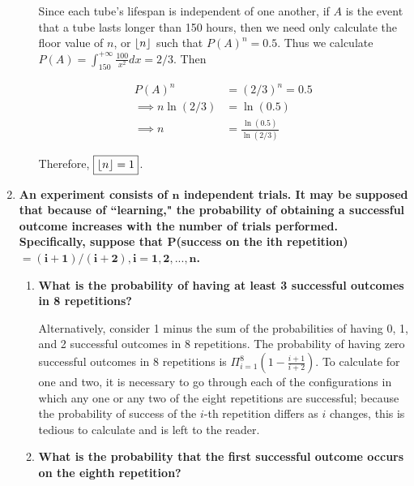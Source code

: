 \documentclass[10pt, oneside]{article}   	%
\theoremstyle{definition}
\DeclarePairedDelimiter\floor{\lfloor}{\rfloor}
\begin{document}
\begin{enumerate}[label=4.\arabic*]
\begin{enumerate}
	Since each tube's lifespan is independent of one another, if $A$ is the event that a tube lasts longer than 150 hours, then we need only calculate the floor value of $n$, or $\floor{n}$ such that $P(A)^n = 0.5$. Thus we calculate $P(A) = \int^{+\infty}_{150} \frac{100}{x^2} dx = 2/3$. Then
	
	\begin{align*}
	P(A)^n &= (2/3)^n = 0.5 \\
	\implies n \ln (2/3) &= \ln (0.5) \\
	\implies n &= \frac{\ln (0.5)}{ \ln(2/3)}
	\end{align*}
	
	Therefore, $\boxed{\floor{n} = 1}$.
	
	\end{enumerate}

\item  \begin{tcolorbox}[
  colback=Cerulean!5!white,
  colframe=Cerulean!75!black]
\textbf{An experiment consists of $\bm{n}$ independent trials. It may be supposed that because of ``learning," the probability of obtaining a successful outcome increases with the number of trials performed. Specifically, suppose that $\bm{P}$(success on the ith repetition) $\bm{= (i+1)/(i+2), i = 1,2,...,n}$.}
\end{tcolorbox}

	\begin{enumerate}
	\item  \begin{tcolorbox}[
	  colback=Cerulean!5!white,
	  colframe=Cerulean!75!black]
	\textbf{What is the probability of having at least 3 successful outcomes in 8 repetitions?}
	\end{tcolorbox}
	
	Alternatively, consider 1 minus the sum of the probabilities of having 0, 1, and 2 successful outcomes in 8 repetitions. The probability of having zero successful outcomes in 8 repetitions is $\Pi_{i=1}^8 (1 - \frac{i+1}{i+2})$. To calculate for one and two, it is necessary to go through each of the configurations in which any one or any two of the eight repetitions are successful; because the probability of success of the $i$-th repetition differs as $i$ changes, this is tedious to calculate and is left to the reader.
	
	\item  \begin{tcolorbox}[
	  colback=Cerulean!5!white,
	  colframe=Cerulean!75!black]
	\textbf{What is the probability that the first successful outcome occurs on the eighth repetition?}
	\end{tcolorbox}
	

\end{enumerate}
\end{enumerate}
\end{document}
